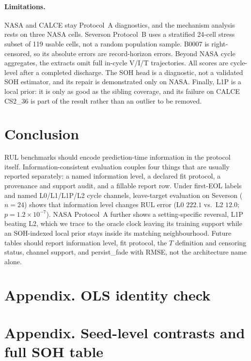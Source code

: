 \paragraph{Limitations.}
NASA and CALCE stay Protocol~A diagnostics, and the mechanism analysis rests on three NASA cells.
Severson Protocol~B uses a stratified 24-cell stress subset of 119 usable cells, not a random population sample.
B0007 is right-censored, so its absolute errors are record-horizon errors.
Beyond NASA cycle aggregates, the extracts omit full in-cycle V/I/T trajectories.
All scores are cycle-level after a completed discharge.
The SOH head is a diagnostic, not a validated SOH estimator, and its repair is demonstrated only on NASA.
Finally, L1P is a local prior: it is only as good as the sibling coverage, and its failure on CALCE CS2\_36 is part of the result rather than an outlier to be removed.

\section{Conclusion}
\label{sec:conclusion}

RUL benchmarks should encode prediction-time information in the protocol itself.
Information-consistent evaluation couples four things that are usually reported separately: a named information level, a declared fit protocol, a provenance and support audit, and a fillable report row.
Under first-EOL labels and named L0/L1/L1P/L2 cycle channels, leave-target evaluation on Severson ($n{=}24$) shows that information level changes RUL error (L0 $222.1$ vs.\ L2 $12.0$; $p=1.2{\times}10^{-7}$).
NASA Protocol~A further shows a setting-specific reversal, L1P beating L2, which we trace to the oracle clock leaving its training support while an SOH-indexed local prior stays inside its matching neighbourhood.
Future tables should report information level, fit protocol, the $T$ definition and censoring status, channel support, and persist\_fade with RMSE, not the architecture name alone.

\section*{Appendix. OLS identity check}


\section*{Appendix. Seed-level contrasts and full SOH table}


